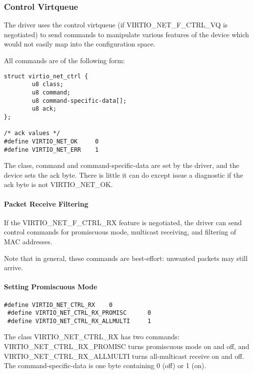 \subsubsection{Control Virtqueue}\label{sec:Device Types / Network Device / Device Operation / Control Virtqueue}

The driver uses the control virtqueue (if VIRTIO_NET_F_CTRL_VQ is
negotiated) to send commands to manipulate various features of
the device which would not easily map into the configuration
space.

All commands are of the following form:

\begin{lstlisting}
struct virtio_net_ctrl {
        u8 class;
        u8 command;
        u8 command-specific-data[];
        u8 ack;
};

/* ack values */
#define VIRTIO_NET_OK     0
#define VIRTIO_NET_ERR    1
\end{lstlisting}

The class, command and command-specific-data are set by the
driver, and the device sets the ack byte. There is little it can
do except issue a diagnostic if the ack byte is not
VIRTIO_NET_OK.

\paragraph{Packet Receive Filtering}\label{sec:Device Types / Network Device / Device Operation / Control Virtqueue / Packet Receive Filtering}

If the VIRTIO_NET_F_CTRL_RX feature is negotiated, the driver can
send control commands for promiscuous mode, multicast receiving,
and filtering of MAC addresses.

Note that in general, these commands are best-effort: unwanted
packets may still arrive.

\paragraph{Setting Promiscuous Mode}\label{sec:Device Types / Network Device / Device Operation / Control Virtqueue / Setting Promiscuous Mode}

\begin{lstlisting}
#define VIRTIO_NET_CTRL_RX    0
 #define VIRTIO_NET_CTRL_RX_PROMISC      0
 #define VIRTIO_NET_CTRL_RX_ALLMULTI     1
\end{lstlisting}

The class VIRTIO_NET_CTRL_RX has two commands:
VIRTIO_NET_CTRL_RX_PROMISC turns promiscuous mode on and off, and
VIRTIO_NET_CTRL_RX_ALLMULTI turns all-multicast receive on and
off. The command-specific-data is one byte containing 0 (off) or
1 (on).

